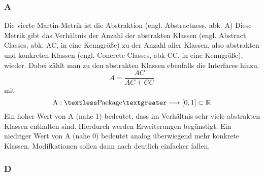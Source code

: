 \documentclass[12pt]{article}
\begin{document}
\subsubsection{A}

Die vierte Martin-Metrik ist die Abstraktion (engl. Abstractness,
abk. A) Diese Metrik gibt das Verhältnis der Anzahl der
abstrakten Klassen (engl. Abstract Classes, abk. AC, in
\cite{Sne10} eine Kenngröße) zu der Anzahl aller Klassen, also
abstrakten und konkreten Klassen (engl.  Concrete Classes, abk
CC, in \cite{Sne10} eine Kenngröße), wieder. Dabei zählt man zu
den abstrakten Klassen ebenfalls die Interfaces hinzu.
\[
        A = \frac{AC}{AC + CC}
\]
mit
\[
        \text{A}: \textless \text{Package} \textgreater
        \longrightarrow [0,1] \subset \mathbb{R}
\]
Ein hoher Wert von A (nahe 1) bedeutet, dass im Verhältnis sehr
viele abstrakten Klassen enthalten sind. Hierdurch werden
Erweiterungen begünstigt.  Ein niedriger Wert von A (nahe 0)
bedeutet analog überwiegend mehr konkrete Klassen. Modifkationen
sollen dann nach \cite{Mar94} deutlich einfacher fallen. 

\subsubsection{D}
\end{document}
